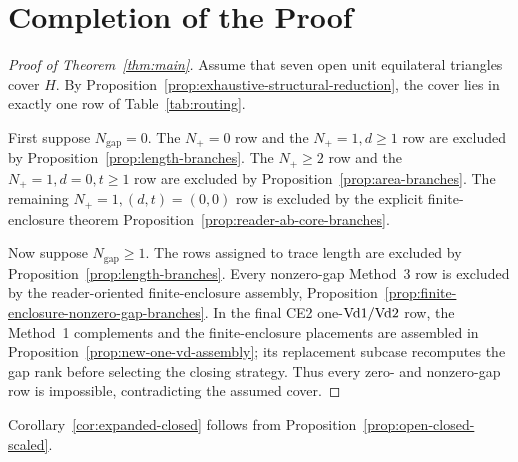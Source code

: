 \section{Completion of the Proof}
\label{sec:assembly}

\begin{proof}[Proof of Theorem~\ref{thm:main}]
Assume that seven open unit equilateral triangles cover $H$.  By
Proposition~\ref{prop:exhaustive-structural-reduction}, the cover lies in
exactly one row of Table~\ref{tab:routing}.

First suppose $N_{\mathrm{gap}}=0$.  The $N_+=0$ row and the
$N_+=1,d\ge1$ row are excluded by
Proposition~\ref{prop:length-branches}.  The $N_+\ge2$ row and the
$N_+=1,d=0,t\ge1$ row are excluded by
Proposition~\ref{prop:area-branches}.  The remaining
$N_+=1,(d,t)=(0,0)$ row is excluded by the explicit finite-enclosure theorem
Proposition~\ref{prop:reader-ab-core-branches}.

Now suppose $N_{\mathrm{gap}}\ge1$.  The rows assigned to trace length are
excluded by Proposition~\ref{prop:length-branches}.  Every nonzero-gap Method~3 row is excluded by the reader-oriented
finite-enclosure assembly, Proposition~\ref{prop:finite-enclosure-nonzero-gap-branches}.  In the final
CE2 one-$\mathrm{Vd1}/\mathrm{Vd2}$ row, the Method~1 complements and the
finite-enclosure placements are assembled in
Proposition~\ref{prop:new-one-vd-assembly}; its replacement subcase
recomputes the gap rank before selecting the closing strategy.  Thus every
zero- and nonzero-gap row is impossible, contradicting the assumed cover.
\end{proof}

Corollary~\ref{cor:expanded-closed} follows from
Proposition~\ref{prop:open-closed-scaled}.
